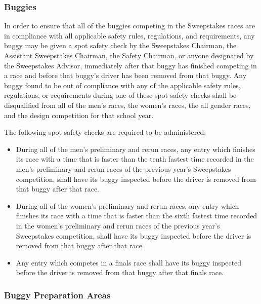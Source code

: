 \subsubsection{Buggies}

	In order to ensure that all of the buggies competing in the Sweepstakes races are in compliance with all applicable safety rules, regulations, and requirements, any buggy may be given a spot safety check by the Sweepstakes Chairman, the Assistant Sweepstakes Chairman, the Safety Chairman, or anyone designated by the Sweepstakes Advisor, immediately after that buggy has finished competing in a race and before that buggy's driver has been removed from that buggy. Any buggy found to be out of compliance with any of the applicable safety rules, regulations, or requirements during one of these spot safety checks shall be disqualified from all of the men's races, the women's races, the all gender races, and the design competition for that school year.
	\newline

	\noindent The following spot safety checks are required to be administered:

	\begin{itemize}

		\item
		During all of the men's preliminary and rerun races, any entry which finishes its race with a time that is faster than the tenth fastest time recorded in the men's preliminary and rerun races of the previous year's Sweepstakes competition, shall have its buggy inspected before the driver is removed from that buggy after that race.

		\item
		During all of the women's preliminary and rerun races, any entry which finishes its race with a time that is faster than the sixth fastest time recorded in the women's preliminary and rerun races of the previous year's Sweepstakes competition, shall have its buggy inspected before the driver is removed from that buggy after that race.

		\item
		Any entry which competes in a finals race shall have its buggy inspected before the driver is removed from that buggy after that finals race.

	\end{itemize}

\subsubsection{Buggy Preparation Areas}
\label{subsec:Buggy Prep}

